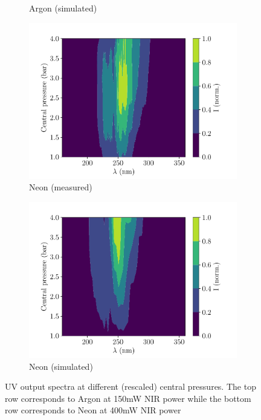 \documentclass[a4paper]{jpconf}
\begin{document}
\begin{figure}[h]
\begin{subfigure}{0.49\textwidth}
    \caption{Argon (simulated)}
    \end{subfigure}   
     \begin{subfigure}{0.49\textwidth}
        \includegraphics[width=\textwidth]{im/2d_spectra_pres_Ne_400mW_meas}
    \caption{Neon (measured)}
    \end{subfigure}
    \begin{subfigure}{0.49\textwidth}
        \includegraphics[width=\textwidth]{im/2d_Ne_sim}
    \caption{Neon (simulated)}
    \end{subfigure}  
\caption{UV output spectra at different (rescaled) central pressures. The top row corresponds to Argon at 150mW NIR power while the bottom row corresponds to Neon at 400mW NIR power}\label{im:spec_2d}
\end{figure}
\end{document}

